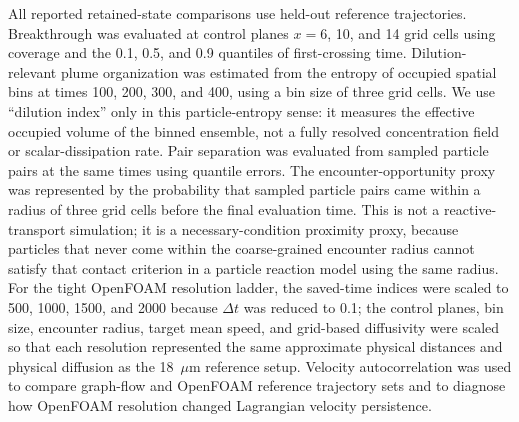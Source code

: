 \documentclass[11pt]{article}
\begin{document}
All reported retained-state comparisons use held-out reference trajectories. Breakthrough was evaluated at control planes $x=6$, 10, and 14 grid cells using coverage and the 0.1, 0.5, and 0.9 quantiles of first-crossing time. Dilution-relevant plume organization was estimated from the entropy of occupied spatial bins at times 100, 200, 300, and 400, using a bin size of three grid cells. We use ``dilution index'' only in this particle-entropy sense: it measures the effective occupied volume of the binned ensemble, not a fully resolved concentration field or scalar-dissipation rate. Pair separation was evaluated from sampled particle pairs at the same times using quantile errors. The encounter-opportunity proxy was represented by the probability that sampled particle pairs came within a radius of three grid cells before the final evaluation time. This is not a reactive-transport simulation; it is a necessary-condition proximity proxy, because particles that never come within the coarse-grained encounter radius cannot satisfy that contact criterion in a particle reaction model using the same radius. For the tight OpenFOAM resolution ladder, the saved-time indices were scaled to 500, 1000, 1500, and 2000 because $\Delta t$ was reduced to 0.1; the control planes, bin size, encounter radius, target mean speed, and grid-based diffusivity were scaled so that each resolution represented the same approximate physical distances and physical diffusion as the 18~$\mu$m reference setup. Velocity autocorrelation was used to compare graph-flow and OpenFOAM reference trajectory sets and to diagnose how OpenFOAM resolution changed Lagrangian velocity persistence.
\end{document}
